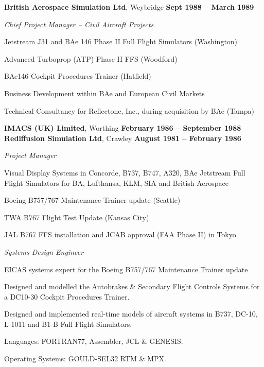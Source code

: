 \documentclass[10pt]{article}
\newenvironment{outerlist}[1][\enskip\textbullet]%
        {\begin{itemize}[#1]}{\end{itemize}%
         \vspace{-.6\baselineskip}}
\newenvironment{innerlist}[1][\enskip\textbullet]%
        {\begin{compactitem}[#1]}{\end{compactitem}}
\newcommand{\blankline}{\quad\pagebreak[2]}
\begin{document}
\blankline

\textbf{British Aerospace Simulation Ltd}, Weybridge        \hfill \textbf{Sept 1988 -- March 1989}

\begin{innerlist}

\item[] \textit{Chief Project Manager -- Civil Aircraft Projects}%
\begin{innerlist}
\item Jetstream J31 and BAe 146 Phase II Full Flight Simulators (Washington)
\item Advanced Turboprop (ATP) Phase II FFS (Woodford)
\item BAe146 Cockpit Procedures Trainer (Hatfield)
\item Business Development within BAe and European Civil Markets
\item Technical Consultancy for Reflectone, Inc., during acquisition by BAe (Tampa)

\end{innerlist}

\end{innerlist}

\blankline

\textbf{IMACS (UK) Limited}, Worthing        \hfill \textbf{February 1986 -- September 1988}\\
\textbf{Rediffusion Simulation Ltd}, Crawley        \hfill \textbf{August 1981 -- February 1986}

\begin{outerlist}
\item[] \textit{Project Manager}%
	\begin{innerlist}
	\item Visual Display Systems in Concorde, B737, B747, A320, BAe Jetstream Full Flight Simulators for BA, Lufthansa, KLM, SIA and British Aerospace
	\item Boeing B757/767 Maintenance Trainer update (Seattle)
	\item TWA B767 Flight Test Update (Kansas City)
	\item JAL B767 FFS installation and JCAB approval (FAA Phase II) in Tokyo
	\end{innerlist}

\item[] \textit{Systems Design Engineer} %
	\begin{innerlist}
	\item EICAS systems expert for the Boeing B757/767 Maintenance Trainer update
	\item Designed and modelled the Autobrakes \& Secondary Flight Controls Systems for a DC10-30 Cockpit Procedures Trainer.
	\item Designed and implemented real-time models of aircraft systems in B737, DC-10, L-1011 and B1-B Full Flight Simulators.
	\item Languages: FORTRAN77, Assembler, JCL \& GENESIS.
	\item Operating Systems: GOULD-SEL32 RTM \& MPX.
	\end{innerlist}
\end{outerlist}
\end{document}
